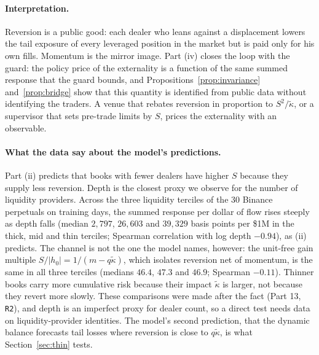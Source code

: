 \paragraph{Interpretation.} Reversion is a public good: each dealer who leans against a displacement lowers the tail exposure of every leveraged position in the market but is paid only for his own fills. Momentum is the mirror image. Part (iv) closes the loop with the guard: the policy price of the externality is a function of the same summed response that the guard bounds, and Propositions~\ref{prop:invariance} and~\ref{prop:bridge} show that this quantity is identified from public data without identifying the traders. A venue that rebates reversion in proportion to $S^2/\tilde\kappa$, or a supervisor that sets pre-trade limits by $S$, prices the externality with an observable.

\paragraph{What the data say about the model's predictions.} Part (ii) predicts that books with fewer dealers have higher $S$ because they supply less reversion. Depth is the closest proxy we observe for the number of liquidity providers. Across the three liquidity terciles of the 30 Binance perpetuals on training days, the summed response per dollar of flow rises steeply as depth falls (median $2{,}797$, $26{,}603$ and $39{,}329$ basis points per \$1M in the thick, mid and thin terciles; Spearman correlation with log depth $-0.94$), as (ii) predicts. The channel is not the one the model names, however: the unit-free gain multiple $S/|h_0|=1/(m-q\tilde\kappa)$, which isolates reversion net of momentum, is the same in all three terciles (medians $46.4$, $47.3$ and $46.9$; Spearman $-0.11$). Thinner books carry more cumulative risk because their impact $\tilde\kappa$ is larger, not because they revert more slowly. These comparisons were made after the fact (Part 13, \texttt{R2}), and depth is an imperfect proxy for dealer count, so a direct test needs data on liquidity-provider identities. The model's second prediction, that the dynamic balance forecasts tail losses where reversion is close to $q\tilde\kappa$, is what Section~\ref{sec:thin} tests.
